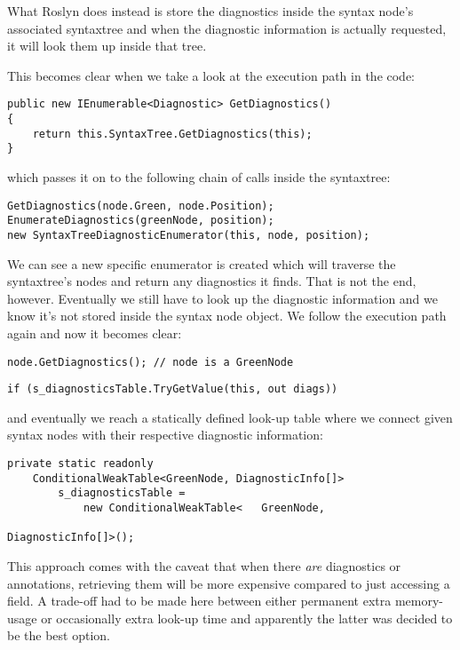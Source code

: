 What Roslyn does instead is store the diagnostics inside the syntax node's associated \gls{syntaxtree} and when the diagnostic information is actually requested, it will look them up inside that tree.

\begin{minipage}{.96\linewidth}
\noindent This becomes clear when we take a look at the execution path in the code:

\begin{lstlisting}
public new IEnumerable<Diagnostic> GetDiagnostics()
{
	return this.SyntaxTree.GetDiagnostics(this);
}
\end{lstlisting}
\end{minipage}

\noindent which passes it on to the following chain of calls inside the \gls{syntaxtree}:

\begin{lstlisting}
GetDiagnostics(node.Green, node.Position);
EnumerateDiagnostics(greenNode, position);
new SyntaxTreeDiagnosticEnumerator(this, node, position);
\end{lstlisting}

\noindent We can see a new specific enumerator is created which will traverse the \gls{syntaxtree}'s nodes and return any diagnostics it finds. That is not the end, however. Eventually we still have to look up the diagnostic information and we know it's not stored inside the syntax node object. We follow the execution path again and now it becomes clear:

\begin{lstlisting}
node.GetDiagnostics(); // node is a GreenNode
\end{lstlisting}

\begin{lstlisting}
if (s_diagnosticsTable.TryGetValue(this, out diags))
\end{lstlisting}

\noindent and eventually we reach a statically defined look-up table where we connect given syntax nodes with their respective diagnostic information:

\begin{lstlisting}
private static readonly 
	ConditionalWeakTable<GreenNode, DiagnosticInfo[]> 
		s_diagnosticsTable =
			new ConditionalWeakTable<	GreenNode, 
																DiagnosticInfo[]>();
\end{lstlisting}

This approach comes with the caveat that when there \textit{are} diagnostics or annotations, retrieving them will be more expensive compared to just accessing a field. A trade-off had to be made here between either permanent extra memory-usage or occasionally extra look-up time and apparently the latter was decided to be the best option.
